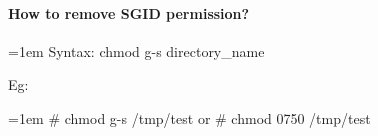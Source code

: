\begin{flushleft}
	\paragraph{How to remove SGID permission?}
	\bigskip
	\begin{tcolorbox}[breakable,notitle,boxrule=0pt,colback=pink,colframe=pink]
		\color{black}
		\font=1em
		Syntax: chmod g-s directory\_name
		\font=4pt
	\end{tcolorbox}
	Eg:
	\begin{tcolorbox}[breakable,notitle,boxrule=-0pt,colback=black,colframe=black]
		\color{green}
		\font=1em
		\# chmod g-s  /tmp/test
		\newline
		or
		\newline
		\# chmod 0750 /tmp/test
		\font=4pt
	\end{tcolorbox}
	
	
	
	
	
\end{flushleft}

\newpage

